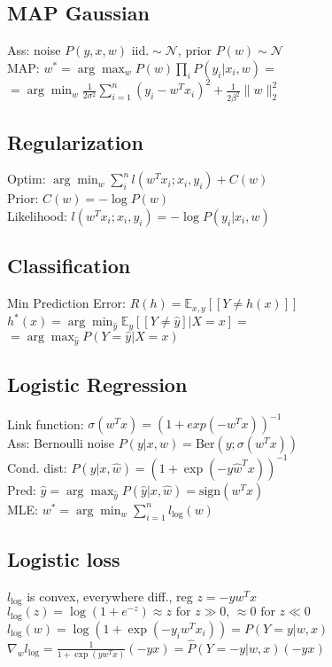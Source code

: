 \subsection*{MAP Gaussian}
Ass: noise $P(y,x,w) \text{ iid.} \sim \mathcal{N}$, prior $P(w) \sim \mathcal{N}$\\
MAP: $ w^*=\arg\max_w P(w) \prod_i P(y_i|x_i,w) =$\\
$=\arg \min_w \frac{1}{2\sigma^2} \sum_{i=1}^n (y_i-w^Tx_i)^2 + \frac{1}{2\beta^2} \|w\|_2^2$

\subsection*{Regularization}
Optim: $\arg\min_w\sum_i^n l(w^Tx_i;x_i,y_i)+C(w)$\\
Prior: $C(w)=-\log P(w)$\\
Likelihood: $l(w^Tx_i;x_i,y_i)=-\log P(y_i|x_i,w) $

\subsection*{Classification}
Min Prediction Error: $ R(h)=\mathds{E}_{x,y}[[Y\neq h(x)]]$\\
$h^*(x)=\arg\min_{\hat{y}}\mathds{E}_y[[Y\neq \hat{y}]|X=x]=$\\
$=\arg\max_{\hat{y}}P(Y=\hat{y}|X=x)$

\subsection*{Logistic Regression}
Link function: $\sigma(w^Tx) = (1+exp(-w^Tx))^{-1}$\\
Ass: Bernoulli noise $P(y|x,w)=\text{Ber}(y;\sigma (w^Tx))$\\
Cond. dist: $P(y|x,\hat{w})=(1+\exp(-y\hat{w}^Tx))^{-1}$\\
Pred: $\hat{y}=\arg\max_{\hat{y}} P(\hat{y}|x,\hat{w})=\text{sign}(w^Tx)$\\
MLE: $w^* = \arg\min_w \sum_{i=1}^n l_{\log}(w)$

\subsection*{Logistic loss}
$l_{\log}$ is convex, everywhere diff., reg $z=-yw^Tx$ \\
$l_{\log}(z)=\log(1+e^{-z})\approx z \text{ for } z \gg 0 \text{, } \approx 0 \text{ for } z \ll 0 $\\
$l_{\log}(w)= \log(1+\exp(-y_iw^Tx_i))=P(Y=y|w,x)$\\
$\nabla_w l_{\log}=\frac{1}{1+\exp(yw^Tx)}(-yx) = \hat{P}(Y=-y|w,x)(-yx)
$

